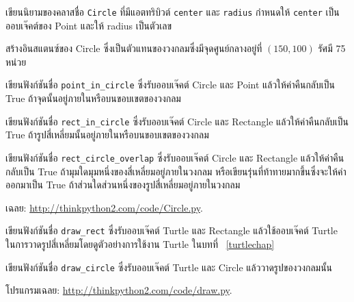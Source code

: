\begin{exercise}


เขียนนิยามของคลาสชื่อ {\tt Circle} ที่มีแอตทริบิวต์ {\tt center} และ {\tt radius} กำหนดให้ {\tt center} เป็นออบเจ๊คต์ของ Point และให้ radius เป็นตัวเลข


สร้างอินสแตนซ์ของ Circle ซึ่งเป็นตัวแทนของวงกลมซึ่งมีจุดศูนย์กลางอยู่ที่ $(150, 100)$ รัศมี 75 หน่วย

เขียนฟังก์ชันชื่อ \verb"point_in_circle" ซึ่งรับออบเจ๊คต์ Circle และ Point แล้วให้ค่าคืนกลับเป็น True ถ้าจุดนั้นอยู่ภายในหรือบนขอบเขตของวงกลม


เขียนฟังก์ชันชื่อ \verb"rect_in_circle" ซึ่งรับออบเจ๊คต์ Circle และ Rectangle แล้วให้ค่าคืนกลับเป็น True ถ้ารูปสี่เหลี่ยมนั้นอยู่ภายในหรือบนขอบเขตของวงกลม



เขียนฟังก์ชันชื่อ \verb"rect_circle_overlap" ซึ่งรับออบเจ๊คต์ Circle และ Rectangle 
แล้วให้ค่าคืนกลับเป็น True ถ้ามุมใดมุมหนึ่งของสี่เหลี่ยมอยู่ภายในวงกลม หรือเขียนรุ่นที่ท้าทายมากขึ้นซึ่งจะให้ค่าออกมาเป็น True 
ถ้าส่วนใดส่วนหนึ่งของรูปสี่เหลี่ยมอยู่ภายในวงกลม


เฉลย: \url{http://thinkpython2.com/code/Circle.py}.

\end{exercise}


\begin{exercise}


เขียนฟังก์ชันชื่อ \verb|draw_rect| ซึ่งรับออบเจ๊คต์  Turtle และ  Rectangle แล้วใช้ออบเจ๊คต์ Turtle 
ในการวาดรูปสี่เหลี่ยมโดยดูตัวอย่างการใช้งาน Turtle ในบทที่ ~\ref{turtlechap}

เขียนฟังก์ชันชื่อ \verb|draw_circle| ซึ่งรับออบเจ๊คต์ Turtle และ  Circle แล้ววาดรูปของวงกลมนั้น

โปรแกรมเฉลย: \url{http://thinkpython2.com/code/draw.py}.

\end{exercise}



